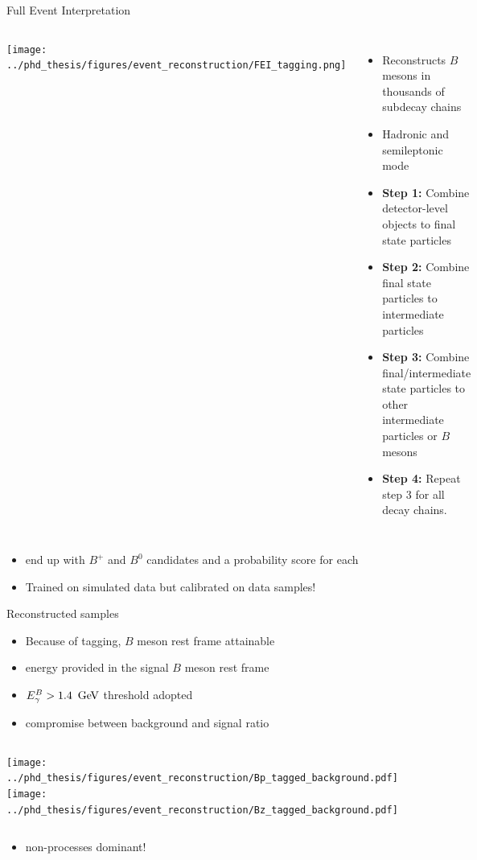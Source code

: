 \documentclass[xcolor=dvipsnames]{beamer}
\begin{document}
   \begin{frame}{Full Event Interpretation}
      \scriptsize
   \begin{columns}
         \texttt{[image: ../phd\_thesis/figures/event\_reconstruction/FEI\_tagging.png]}
         \begin{itemize}
            \item Reconstructs $B$ mesons in thousands of subdecay chains
            \item Hadronic and semileptonic mode
            \item \textbf{Step 1:} Combine detector-level objects to final state particles
            \item \textbf{Step 2:} Combine final state particles to intermediate particles
            \item \textbf{Step 3:} Combine final/intermediate state particles to other intermediate particles or $B$ mesons
            \item \textbf{Step 4:} Repeat step 3 for all decay chains.
         \end{itemize}
      
   \end{columns}
\begin{itemize}
   \item[\ra] end up with $B^+$ and $B^0$ candidates and a probability score \feiProb for each
   \item Trained on simulated data but calibrated on data samples!
\end{itemize}   
\end{frame}

\begin{frame}{Reconstructed samples}
   \scriptsize
   \begin{itemize}
      \item Because of tagging, $B$ meson rest frame attainable
      \item[\ra] energy provided in the signal $B$ meson rest frame
      \item ${E^B_{\gamma}}>1.4~\mathrm{\,Ge\kern -0.1em V}$ threshold adopted
      \item[\ra] compromise between background and signal ratio
   \end{itemize}
   \begin{columns}
      \texttt{[image: ../phd\_thesis/figures/event\_reconstruction/Bp\_tagged\_background.pdf]}
      \texttt{[image: ../phd\_thesis/figures/event\_reconstruction/Bz\_tagged\_background.pdf]}
   \end{columns}
   \begin{itemize}
      \item[\ra] non-\FourS processes dominant!
   \end{itemize}
\end{frame}
\end{document}
